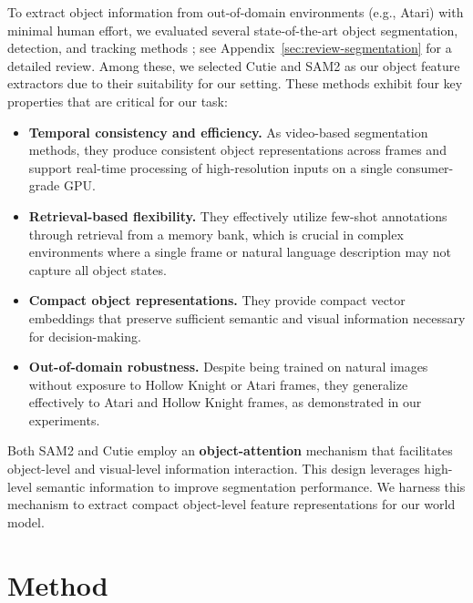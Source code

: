 \documentclass{article} %
\begin{document}
To extract object information from out-of-domain environments (e.g., Atari) with minimal human effort, we evaluated several state-of-the-art object segmentation, detection, and tracking methods \citep{cheng_xmem_2022, cheng_putting_2023, kirillov_segment_2023, zhang_personalize_2023, ravi_sam_2024, redmon_you_2016, jocher_ultralytics_2023, liu_grounding_2023, locatello_object-centric_2020, kipf_conditional_2022, elsayed_savi_2022, wang_tracking_2023, xu_unifying_2023}; see Appendix~\ref{sec:review-segmentation} for a detailed review. Among these, we selected Cutie \citep{cheng_putting_2023} and SAM2 \citep{ravi_sam_2024} as our object feature extractors due to their suitability for our setting. These methods exhibit four key properties that are critical for our task:
\begin{itemize}
    \item \textbf{Temporal consistency and efficiency.} As video-based segmentation methods, they produce consistent object representations across frames and support real-time processing of high-resolution inputs on a single consumer-grade GPU.
    \item \textbf{Retrieval-based flexibility.} They effectively utilize few-shot annotations through retrieval from a memory bank, which is crucial in complex environments where a single frame or natural language description may not capture all object states.
    \item \textbf{Compact object representations.} They provide compact vector embeddings that preserve sufficient semantic and visual information necessary for decision-making. 
    \item \textbf{Out-of-domain robustness.} Despite being trained on natural images without exposure to Hollow Knight or
Atari frames, they generalize effectively to Atari and Hollow Knight frames, as demonstrated in our experiments.
\end{itemize}

Both SAM2 and Cutie employ an \textbf{object-attention} mechanism that facilitates object-level and visual-level information interaction. This design leverages high-level semantic information to improve segmentation performance. We harness this mechanism to extract compact object-level feature representations for our world model.


\section{Method} \label{sec:method}
\end{document}

